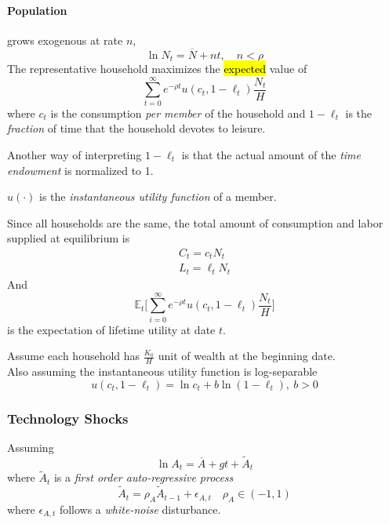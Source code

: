 \documentclass[11pt]{article}
\newcommand{\expat}[2]{\mathbb{E}_{#1}\Big[{#2}\Big]}
\begin{document}
				\paragraph{Population} grows exogenous at rate $n$,
					\begin{equation}
						\ln N_t = \overline{N} + nt,\quad n < \rho
					\end{equation}
				The representative household maximizes the \hl{expected} value of
				\begin{equation}
					\sum_{t=0}^\infty e^{-\rho t} u(c_t, 1- \ell_t) \frac{N_t}{H}
				\end{equation}
				where $c_t$ is the consumption \emph{per member} of the household and $1-\ell_t$ is the \emph{fraction} of time that the household devotes to leisure.
				\begin{remark}
					Another way of interpreting $1-\ell_t$ is that the actual amount of the \emph{time endowment} is normalized to 1.
				\end{remark}
				\par $u(\cdot)$ is the \emph{instantaneous utility function} of a member.
				\par Since all households are the same, the total amount of consumption and labor supplied at equilibrium is
				\begin{gather}
					C_t = c_t N_t \\
					L_t = \ell_t N_t
				\end{gather}
				And 
				\begin{equation}
					\expat{t}{\sum_{i=0}^\infty e^{-\rho t} u(c_t, 1- \ell_t) \frac{N_t}{H}}
				\end{equation}
				is the expectation of lifetime utility at date $t$.
				\par Assume each household has $\frac{K_0}{H}$ unit of wealth at the beginning date. \\
				Also assuming the instantaneous utility function is log-separable
				\begin{equation}
					u(c_t, 1-\ell_t) = \ln c_t + b \ln(1-\ell_t),\ b > 0
				\end{equation}
			\subsubsection{Technology Shocks}
				\par Assuming
				\begin{equation}
					\ln A_t = \overline{A} + gt + \tilde{A}_t
				\end{equation}
				where $\tilde{A}_t$ is a \emph{first order auto-regressive process}
				\begin{equation}
					\tilde{A}_t = \rho_A \tilde{A}_{t-1} + \epsilon_{A, t}\quad \rho_A \in (-1, 1)
				\end{equation}
				where $\epsilon_{A,t}$ follows a \emph{white-noise} disturbance.
			
\end{document}
